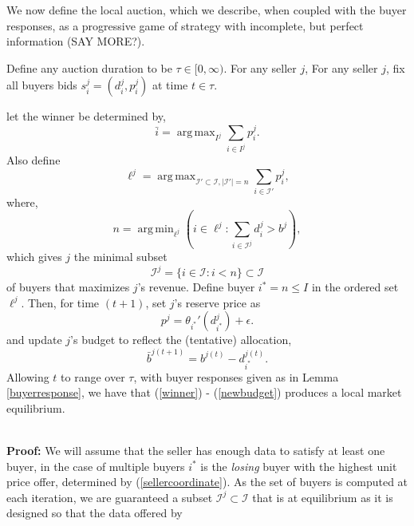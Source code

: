 \documentclass[12pt]{article}
\theoremstyle{definition}
\newcommand{\mcI}{\mathcal{I}}
\DeclareMathOperator*{\argmax}{arg\,max}
\DeclareMathOperator*{\argmin}{arg\,min}
\begin{document}
\begin{multicols}{2}
We now define the local auction, which we describe, when coupled with the buyer
responses, as a progressive game of strategy with incomplete, but perfect
information (SAY MORE?).
{
\label{sellerstrategy}
Define any auction duration to be $\tau \in [0,\infty)$. For any seller $j$,
For any seller $j$, fix all buyers bids $s_i^j=(d_i^j,p_i^j)$ at time $t\in\tau$.

let the winner be determined by,
\begin{equation}\label{winner}
    \bar{i} = \displaystyle\argmax_{I^j}\sum_{i\in I^j} p_i^j.
\end{equation}
Also define
$$
    \ell^j =\argmax_{{\mcI}' \subset \mcI, \vert{\mcI}'\vert =
n}\sum_{i\in{\mcI}'} p_i^j,
$$
where,
\begin{equation}\label{sellercoordinate}
    n = \argmin_{\ell^j}(i \in \ell^j : \displaystyle\sum_{i\in\mcI^j} d_i^j >
b^j),
\end{equation} 
which gives $j$ the minimal subset 
\begin{equation}\label{buyers}
    \mcI^j = \lbrace i \in \mcI : i < n\rbrace \subset \mcI
\end{equation} 
of buyers that maximizes $j$'s revenue.
Define buyer $i^* = n \le I$ in the ordered set $\ell^j$.
Then, for time $(t+1)$, set $j$'s reserve price as 
\begin{equation}\label{newprice}
    p^j = \theta_{i^*}'(d_{i^*}^j) + \epsilon.
\end{equation}
and update $j$'s budget to reflect the (tentative) allocation,
\begin{equation}\label{newbudget}
    \bar{b}^{j(t+1)} = b^{j(t)} - d_{i^*}^{j(t)}.
\end{equation}
Allowing $t$ to range over $\tau$, with buyer responses given as in Lemma
\ref{buyerresponse}, we have that (\ref{winner}) - (\ref{newbudget}) produces a local
market equilibrium.%
}\\
\textbf{Proof:}
We will assume that the seller has enough data to satisfy at least one buyer,
in the case of multiple buyers $i^*$ is the \emph{losing} buyer with the highest unit
price offer, determined by (\ref{sellercoordinate}). As the set of buyers is
computed at each iteration, we are guaranteed a subset $\mcI^j \subset \mcI$ that is 
at equilibrium as it is designed so that the data offered by

\end{multicols}
\end{document}
